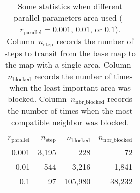 \documentclass[ijgi,article,submit,moreauthors,pdftex]{Definitions/mdpi}
\begin{document}
\begin{table}[tb]
\centering
\caption{Some statistics when different parallel parameters area used 
    (\ie~$r_\mathrm{parallel}=0.001$, $0.01$, or $0.1$).
    Column~$n_\mathrm{step}$ records the number of steps to transit 
    from the base map to the map with a single area.    
    Column~$n_\mathrm{blocked}$ records the number of times
    when the least important area was blocked.
    Column~$n_\mathrm{nbr\_blocked}$ records the number of times 
    when the most compatible neighbor was blocked.
}
\begin{tabular}{rrrr}
\toprule
$r_\mathrm{parallel}$   & $n_\mathrm{step}$ & $n_\mathrm{blocked}$  & $n_\mathrm{nbr\_blocked}$ \\ \midrule
0.001                   &  3{,}195          &       228             &       72                  \\
0.01                    &  544              &   3{,}216             &  1{,}841                  \\
0.1                     &  97               & 105{,}980             & 38{,}232                  \\ 
\bottomrule 
\end{tabular}
\label{tbl:parallel_param_comparison}
\end{table}
\end{document}
